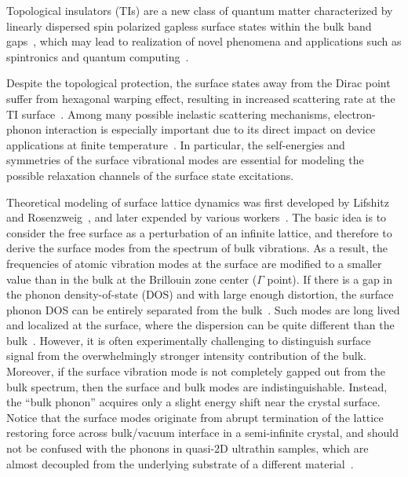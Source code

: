 \documentclass[reprint,aps,pra,superscriptaddress,amsmath,amssymb,linenumbers,longbibliography]{revtex4-1}
\begin{document}
Topological insulators (TIs) are a new class of quantum matter characterized by linearly dispersed spin polarized gapless surface states within the bulk band gaps~\cite{Fu2007A,Zhang2009,Hsieh2009,Xia2009,Checkelsky2009,Bianchi2010,Beidenkopf2011,Hasan2011}, which may lead to realization of novel phenomena and applications such as spintronics and quantum computing~\cite{Fu2008,Qi2008,Qi2009,Hasan2010,Yu2010,Raghu2010,Hasan2011,Qi2011,Wang2013B,Grover2014}.

Despite the topological protection, the surface states away from the Dirac point suffer from hexagonal warping effect, resulting in increased scattering rate at the TI surface~\cite{Butch2010B,Pan2012,Valla2012}.
Among many possible inelastic scattering mechanisms, electron-phonon interaction is especially important due to its direct impact on device applications at finite temperature~\cite{Parente2013,Costache2014}.
In particular, the self-energies and symmetries of the surface vibrational modes are essential for modeling the possible relaxation channels of the surface state excitations.

Theoretical modeling of surface lattice dynamics was first developed by Lifshitz and Rosenzweig~\cite{Lifshitz1948,Lifshitz1956}, and later expended by various workers~\cite{Wallis1957,Wallis1959,Benedek1991,Wallis1994}.
The basic idea is to consider the free surface as a perturbation of an infinite lattice, and therefore to derive the surface modes from the spectrum of bulk vibrations.
As a result, the frequencies of atomic vibration modes at the surface are modified to a smaller value than in the bulk at the Brillouin zone center ($\Gamma$ point).
If there is a gap in the phonon density-of-state (DOS) and with large enough distortion, the surface phonon DOS can be entirely separated from the bulk~\cite{Lifshitz1948,Wallis1959}.
Such modes are long lived and localized at the surface, where the dispersion can be quite different than the bulk~\cite{Lagos2017}.
However, it is often experimentally challenging to distinguish surface signal from the overwhelmingly stronger intensity contribution of the bulk.
Moreover, if the surface vibration mode is not completely gapped out from the bulk spectrum, then the surface and bulk modes are indistinguishable.
Instead, the ``bulk phonon'' acquires only a slight energy shift near the crystal surface.
Notice that the surface modes originate from abrupt termination of the lattice restoring force across bulk/vacuum interface in a semi-infinite crystal, and should not be confused with the phonons in quasi-2D ultrathin samples, which are almost decoupled from the underlying substrate of a different material~\cite{Zhao2011,Zhang2011,Chis2012,Humlicek2014,Eddrief2014}.
\end{document}

